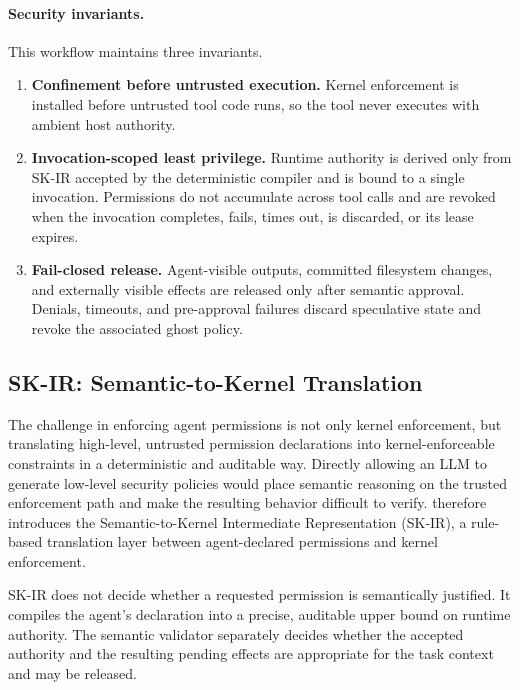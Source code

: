 \paragraph{Security invariants.}
This workflow maintains three invariants.

\begin{enumerate}[leftmargin=1.2em]
\item \textbf{Confinement before untrusted execution.}
Kernel enforcement is installed before untrusted tool code runs, so the tool
never executes with ambient host authority.

\item \textbf{Invocation-scoped least privilege.}
Runtime authority is derived only from SK-IR accepted by the deterministic
compiler and is bound to a single invocation. Permissions do not accumulate
across tool calls and are revoked when the invocation completes, fails, times
out, is discarded, or its lease expires.

\item \textbf{Fail-closed release.}
Agent-visible outputs, committed filesystem changes, and externally visible
effects are released only after semantic approval. Denials, timeouts, and
pre-approval failures discard speculative state and revoke the associated ghost
policy.
\end{enumerate}

\subsection{SK-IR: Semantic-to-Kernel Translation}
\label{sec:design:ir}

The challenge in enforcing agent permissions is not only kernel enforcement,
but translating high-level, untrusted permission declarations into
kernel-enforceable constraints in a deterministic and auditable way. Directly
allowing an LLM to generate low-level security policies would place semantic
reasoning on the trusted enforcement path and make the resulting behavior
difficult to verify. \SystemName therefore introduces the Semantic-to-Kernel
Intermediate Representation (SK-IR), a rule-based translation layer between
agent-declared permissions and kernel enforcement.

SK-IR does not decide whether a requested permission is semantically justified.
It compiles the agent's declaration into a precise, auditable upper bound on
runtime authority. The semantic validator separately decides whether the
accepted authority and the resulting pending effects are appropriate for the
task context and may be released.

